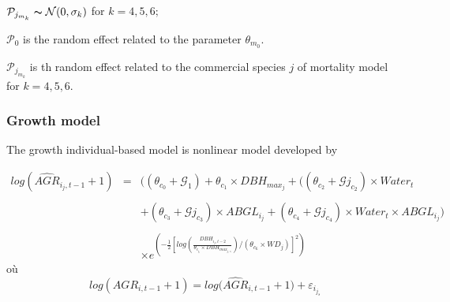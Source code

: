 \documentclass[review]{elsarticle}
\begin{document}
$\mathcal{P}_{j_{m_{k}}} \thicksim \mathcal{N}(0,\sigma_{k})$  
for $k = 4,5,6;$

 $\mathcal{P}_{0}$ is the random effect related to the parameter $\theta_{m_{0}}.$

 $\mathcal{P}_{j_{m_{k}}}$ is th random effect related to the commercial species $j$ of mortality model for $k = 4,5,6.$ 




 
 


\subsubsection{Growth model}

The growth individual-based model is nonlinear model developed by

 \begin{equation}\label{modele_croissance}
 \begin{array}{lcl}
 log (\widehat{AGR}_{i_{j},t-1}+1) & = & \Big((\theta_{c_{0}}+\mathcal{G}_{1})+\theta_{c_{1}}\times DBH_{max_{j}}+((\theta_{c_{2}}+\mathcal{G}{j_{c_{2}}} )\times Water_{t}\\\\
 && + (\theta_{c_{3}}+\mathcal{G}{j_{c_{3}}} ) \times ABGL_{i_{j}} +(\theta_{c_{4}}+\mathcal{G}{j_{c_{4}}})\times Water_{t} \times ABGL_{i_{j}}\Big)\\\\
 &&\times \displaystyle e^{\left(-\frac{1}{2}\left[log\left(\frac{DBH_{i_{j},t-2}}{\theta_{c_{5}}\times DBH_{max_{j,s}}}\right)/(\theta_{c_{6}}\times WD_{j})\right]^{2}\right)}
 \end{array} 
 \end{equation}
où 
 $$
  log (AGR_{i,t-1}+1) = log \Big(\widehat{AGR}_{i,t-1}+1\Big) +\varepsilon_{i_{{j}_{s}}}
 $$  
 
\end{document}
